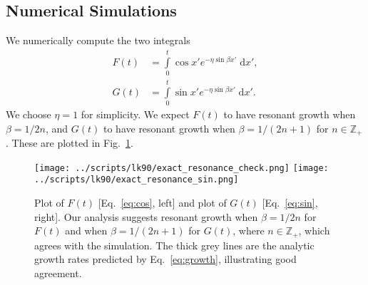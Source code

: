 \documentclass[11pt,
        usenames, %
        dvipsnames %
    ]{article}
\begin{document}
\subsection{Numerical Simulations}

We numerically compute the two integrals
\begin{align}
    F(t) &= \int\limits_0^t \cos x' e^{-\eta \sin \beta x'}\;\mathrm{d}x',
        \label{eq:cos}\\
    G(t) &= \int\limits_0^t \sin x' e^{-\eta \sin \beta x'}\;\mathrm{d}x'.
        \label{eq:sin}
\end{align}
We choose $\eta = 1$ for simplicity. We expect $F(t)$ to have resonant growth
when $\beta = 1 / 2n$, and $G(t)$ to have resonant growth when $\beta = 1 / (2n
+ 1)$ for $n \in \mathbb{Z}_+$. These are plotted in
Fig.~\ref{fig:resonant_check}.
\begin{figure}
    \centering
    \texttt{[image: ../scripts/lk90/exact\_resonance\_check.png]}
    \texttt{[image: ../scripts/lk90/exact\_resonance\_sin.png]}
    \caption{Plot of $F(t)$ [Eq.~\eqref{eq:cos}, left] and plot of $G(t)$
    [Eq.~\eqref{eq:sin}, right]. Our analysis suggests resonant growth when
    $\beta = 1 / 2n$ for $F(t)$ and when $\beta = 1 / (2n + 1)$ for $G(t)$,
    where $n \in \mathbb{Z}_+$, which agrees with the simulation. The thick
    grey lines are the analytic growth rates predicted by
    Eq.~\eqref{eq:growth}, illustrating good
    agreement.}\label{fig:resonant_check}
\end{figure}
\end{document}
